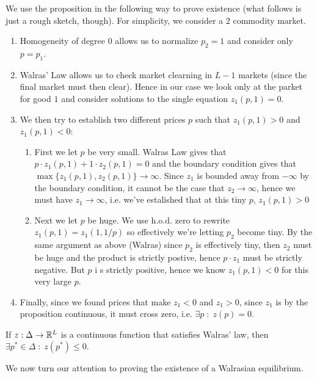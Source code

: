 We use the proposition in the following way to prove existence (what
follows is just a rough sketch, though). For simplicity, we consider a
$2$ commodity market.
\begin{enumerate}
\item Homogeneity of degree $0$ allows us to normalize $p_2 = 1$ and
  consider only $p = p_1$.
\item Walras' Law allows us to check market clearning in $L-1$ markets
  (since the final market must then clear). Hence in our case we look
  only at the parket for good $1$ and consider solutions to the single
  equation $z_1(p, 1) = 0$.
\item We then try to establish two different prices $p$ such that
  $z_1(p, 1) > 0$ and $z_1(p, 1) < 0$:
  \begin{enumerate}
  \item First we let $p$ be very small. Walras Law gives that $p \cdot
    z_1(p, 1) + 1 \cdot z_2(p, 1) = 0$ and the boundary condition
    gives that $\max \{z_1(p,1), z_2(p,1)\} \to \infty$. Since $z_1$
    is bounded away from $-\infty$ by the boundary condition, it
    cannot be the case that $z_2 \to \infty$, hence we must have $z_1
    \to \infty$, i.e. we've estalished that at this tiny $p$, $z_1(p,
    1) > 0$
  \item Next we let $p$ be huge. We use h.o.d. zero to rewrite $z_1(p,
    1) = z_1(1, 1/p)$ so effectively we're letting $p_2$ become
    tiny. By the same argument as above (Walras) since $p_2$ is
    effectively tiny, then $z_2$ must be huge and the product is
    strictly postive, hence $p \cdot z_1$ must be strictly
    negative. But $p$ i s strictly positive, hence we know $z_1(p, 1)
    < 0$ for this very large $p$.
  \end{enumerate}
\item Finally, since we found prices that make $z_1 < 0$ and $z_1 >
  0$, since $z_1$ is by the proposition continuous, it must cross
  zero, i.e. $\exists p \; : \; z(p) = 0$.
\end{enumerate}

\begin{prop}
  If $z : \Delta \to {\mathbb R}^L$ is a continuous function that satisfies
  Walras' law, then $\exists p^* \in \Delta \; : \; z(p^*) \leq 0$.
\end{prop}

We now turn our attention to proving the existence of a Walrasian
equilibrium.

